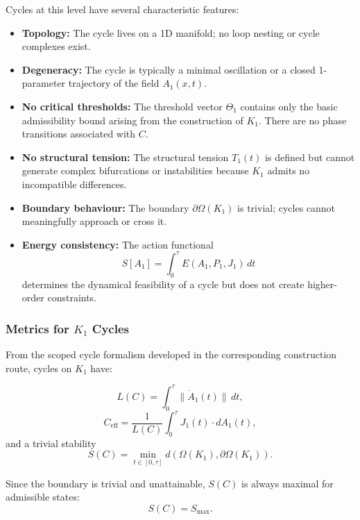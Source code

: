 Cycles at this level have several characteristic features:

\begin{itemize}
  \item \textbf{Topology:}  
        The cycle lives on a 1D manifold; no loop nesting or cycle
        complexes exist.

  \item \textbf{Degeneracy:}  
        The cycle is typically a minimal oscillation or a closed
        1-parameter trajectory of the field $A_1(x,t)$.

  \item \textbf{No critical thresholds:}  
        The threshold vector $\Theta_1$ contains only the basic
        admissibility bound arising from the construction of $K_1$.
        There are no phase transitions associated with $C$.

  \item \textbf{No structural tension:}  
        The structural tension
        $T_1(t)$ is defined but cannot generate complex bifurcations or
        instabilities because $K_1$ admits no incompatible differences.

  \item \textbf{Boundary behaviour:}  
        The boundary $\partial\Omega(K_1)$ is trivial; cycles cannot
        meaningfully approach or cross it.

  \item \textbf{Energy consistency:}  
        The action functional
        \[
          S[A_1] = \int_0^\tau E(A_1,P_1,J_1)\, dt
        \]
        determines the dynamical feasibility of a cycle but does not
        create higher-order constraints.
\end{itemize}

\subsubsection{Metrics for \texorpdfstring{$K_1$}{K_1} Cycles}

From the scoped cycle formalism developed in the corresponding construction route, cycles on $K_1$
have:

\[
  L(C) = \int_0^\tau \| \dot{A}_1(t) \|\, dt,
\]
\[
  C_{\mathrm{eff}} =
    \frac{1}{L(C)} \int_0^\tau J_1(t)\cdot dA_1(t),
\]
and a trivial stability
\[
  S(C) = \min_{t\in[0,\tau]} d(\Omega(K_1),\partial\Omega(K_1)).
\]

Since the boundary is trivial and unattainable, $S(C)$ is always
maximal for admissible states:
\[
  S(C) = S_{\max}.
\]


